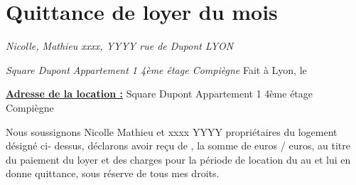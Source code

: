 \documentclass[a4paper,12pt]{article}
\begin{document}

\section*{\centering \huge Quittance de loyer du mois }

\begin{flushleft} 
\textit{\linebreak Nicolle, Mathieu \linebreak
xxxx, YYYY  rue de Dupont  LYON}
\end{flushleft}

\begin{flushright}
\textit{
  Square Dupont \linebreak
Appartement 1 4ème étage  Compiègne} \linebreak
\linebreak
Fait à Lyon, le 
\end{flushright}

\begin{flushleft} 
\underline{\textbf{Adresse de la location :}} Square Dupont \linebreak
Appartement 1 4ème étage  Compiègne
\end{flushleft}

Nous soussignons Nicolle Mathieu et xxxx YYYY propriétaires du logement désigné ci- dessus, déclarons avoir reçu de , la somme de  euros /  euros, au titre du paiement du loyer et des charges pour la période de location du  au  et lui en donne quittance, sous réserve de tous mes droits.
\end{document}
